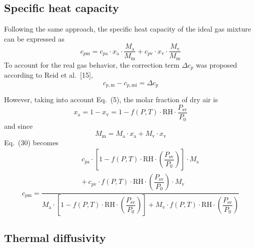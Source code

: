 \documentclass[11pt]{article}
\newcommand{\Psv}{P_\mathrm{sv}}
\newcommand{\RH}{\mathrm{RH}}
\newcommand{\fPT}{f(P,T)}
\newcommand{\grp}{\fPT\cdot\RH\cdot\left(\dfrac{\Psv}{P_0}\right)}
\begin{document}
\subsection{Specific heat capacity}


\noindent Following the same approach, the specific heat capacity of
the ideal gas mixture can be expressed as
\begin{equation}
c_{p\mathrm{m}} = c_{p\mathrm{a}}\cdot x_\mathrm{a}
  \cdot\frac{M_\mathrm{a}}{M_\mathrm{m}}
  + c_{p\mathrm{v}}\cdot x_\mathrm{v}
  \cdot\frac{M_\mathrm{v}}{M_\mathrm{m}}
\end{equation}
To account for the real gas behavior, the correction term $\Delta c_p$
was proposed according to Reid et al.\ [15],
\begin{equation}
c_{p,\mathrm{m}} - c_{p,\mathrm{mi}} = \Delta c_p
\end{equation}


\noindent However, taking into account Eq.~(5), the molar fraction of
dry air is
\begin{equation}
x_\mathrm{a} = 1 - x_\mathrm{v}
             = 1 - \fPT\cdot\RH\cdot\frac{\Psv}{P_0}
\end{equation}
and since
\begin{equation}
M_\mathrm{m} = M_\mathrm{a}\cdot x_\mathrm{a}
             + M_\mathrm{v}\cdot x_\mathrm{v}
\end{equation}
Eq.~(30) becomes
\begin{equation}
c_{p\mathrm{m}} = \frac{
   \begin{array}{c}
   c_{p\mathrm{a}}\cdot\left[1-\grp\right]\cdot M_\mathrm{a} \\
   + \,c_{p\mathrm{v}}\cdot\grp\cdot M_\mathrm{v}
   \end{array}}
  {M_\mathrm{a}\cdot\left[1-\grp\right]
       + M_\mathrm{v}\cdot\grp}
\end{equation}

\subsection{Thermal diffusivity}
\end{document}
